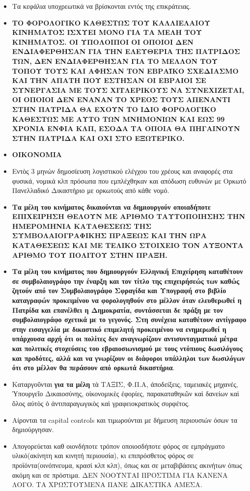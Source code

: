 \documentclass[a4paper]{article}
\begin{document}
\begin{itemize}
\item  Τα κεφάλια υποχρεωτικά να βρίσκονται εντός της επικράτειας.
\item  \textbf{ΤΟ ΦΟΡΟΛΟΓΙΚΟ ΚΑΘΕΣΤΩΣ ΤΟΥ ΚΑΛΛΙΕΛΑΙΟΥ ΚΙΝΗΜΑΤΟΣ ΙΣΧΥΕΙ ΜΟΝΟ ΓΙΑ ΤΑ ΜΕΛΗ ΤΟΥ ΚΙΝΗΜΑΤΟΣ. ΟΙ ΥΠΟΛΟΙΠΟΙ ΟΙ ΟΠΟΙΟΙ ΔΕΝ ΕΝΔΙΑΦΕΡΘΗΣΑΝ ΓΙΑ ΤΗΝ ΕΛΕΥΘΕΡΙΑ ΤΗΣ ΠΑΤΡΙΔΟΣ ΤΩΝ, ΔΕΝ ΕΝΔΙΑΦΕΡΘΗΣΑΝ ΓΙΑ ΤΟ ΜΕΛΛΟΝ ΤΟΥ ΤΟΠΟΥ ΤΟΥΣ ΚΑΙ ΑΦΗΣΑΝ ΤΟΝ ΕΒΡΑΪΚΟ ΣΧΕΔΙΑΣΜΟ ΚΑΙ ΤΗΝ ΑΠΑΤΗ ΠΟΥ ΕΣΤΗΣΑΝ ΟΙ ΕΒΡΑΙΟΙ ΣΕ ΣΥΝΕΡΓΑΣΙΑ ΜΕ ΤΟΥΣ ΧΙΤΛΕΡΙΚΟΥΣ ΝΑ ΣΥΝΕΧΙΖΕΤΑΙ, ΟΙ ΟΠΟΙΟΙ ΔΕΝ ΕΝΑΝΑΝ ΤΟ ΧΡΕΟΣ ΤΟΥΣ ΑΠΕΝΑΝΤΙ ΣΤΗΝ ΠΑΤΡΙΔΑ ΘΑ ΕΧΟΥΝ ΤΟ ΙΔΙΟ ΦΟΡΟΛΟΓΙΚΟ ΚΑΘΕΣΤΩΣ ΜΕ ΑΥΤΟ ΤΩΝ ΜΝΗΜΟΝΙΩΝ ΚΑΙ ΕΩΣ 99 ΧΡΟΝΙΑ ΕΝΦΙΑ ΚΛΠ, ΕΣΟΔΑ ΤΑ ΟΠΟΙΑ ΘΑ ΠΗΓΑΙΝΟΥΝ ΣΤΗΝ ΠΑΤΡΙΔΑ ΚΑΙ ΟΧΙ ΣΤΟ ΕΞΩΤΕΡΙΚΟ.}

\item  \textbf{ΟΙΚΟΝΟΜΙΑ}

\item Εντὸς 3 μηνών δημοσίευση λογιστικού ελέγχου του χρέους και αναφορές στα φυσικά, νομικά κλπ πρόσωπα που εμπλέχθηκαν και απόδωση ευθυνών με Ορκωτό Πανελλαδικό Δικαστήριο με ορκωτούς από κάθε νομό.
\item \textbf{Τα μέλη του κινήματος δικαιούνται να δημιουργούν οποιαδήποτε ΕΠΙΧΕΙΡΗΣΗ ΘΕΛΟΥΝ ΜΕ ΑΡΙΘΜΟ ΤΑΥΤΟΠΟΙΗΣΗΣ ΤΗΝ ΗΜΕΡΟΜΗΝΙΑ ΚΑΤΑΘΕΣΕΩΣ ΤΗΣ ΣΥΜΒΟΛΑΙΟΓΡΑΦΙΚΗΣ ΠΡΑΞΕΩΣ ΚΑΙ ΤΗΝ ΩΡΑ ΚΑΤΑΘΕΣΕΩΣ ΚΑΙ ΜΕ ΤΕΛΙΚΟ ΣΤΟΙΧΕΙΟ ΤΟΝ ΑΥΞΟΝΤΑ ΑΡΙΘΜΟ ΤΟΥ ΠΟΛΙΤΟΥ ΣΤΗΝ ΠΡΑΞΗ.} 
\item \textbf{Τα μέλη του κινήματος που δημιουργούν Ελληνική Επιχείρηση καταθέτουν σε συμβολαιογράφο την έναρξη και τον τίτλο της επιχειρήσεώς των καθώς ζητούν από τον Συμβολαιογράφο Σφραγίδα και Υπογραφή στο βιβλίο καταγραφών προκειμένου να φορολογηθούν στο μέλλον όταν ελευθερωθεί η Πατρίδα και επανέλθει η Δημοκρατία, συντάσσεται δε πράξη με τον συμβολαιογράφο σχετικά με το γεγονός. Στη συνέχεια καταθέτουν αντίγραφο στην εισαγγελία με δικαστικό επιμελητή προκειμένου να ενημερωθεί η υπάρχουσα αρχή ότι οι πολίτες δεν αναγνωρίζουν αντισυνταγματικά μέτρα και πολιτικές στοχεύσεις του εβραιοσιωνισμού με τους ντόπιους δωσιλόγους και προδότες, αλλά και να γνωρίζουν οι διάφοροι υπάλληλοι των δωσιλόγων ότι στο μέλλον θα περάσουν από ορκωτά δικαστήρια}.
\item Καταργοῦνται \textbf{για τα μέλη} τὰ ΤΑΞΙΣ, Φ.Π.Α, ἀποδείξεις, ταμειακὲς μηχανές, Ὑπουργεῖο Δικαιοσύνης, οἰκονομικὲς ἐφορίες, παρακαταθηκῶν καὶ δανείων καὶ ὅλος αὐτὸς ὁ ἀντιπαραγωγικὸς καὶ γραφειοκρατικὸς συρφέτος.
\item Αίρονται τα capital controls και τιμωρούνται με δήμευση περιουσιών όσων τα δημιούργησαν.
\item Απογορεύεται καθ οιονδήποτε τρόπον οποιοσδήποτε φόρος σε εμπράγματο υλικό(ακίνητη και κινητή περιουσία), κι επιπρόσθετος φόρος σε προϊόντα(οινόπνευμα, κρασί κλπ κλπ), όπως και σε μεταβιβάσεις ακινήτων όπως ακόμη και σε πρόστιμα. ΔΕΝ ΝΟΟΥΝΤΑΙ ΠΡΟΣΤΙΜΑ ΓΙΑ ΚΑΝΕΝΑ ΛΟΓΟ. ΤΑ ΧΡΩΣΤΟΥΜΕΝΑ ΠΑΝΕ ΔΙΚΑΣΤΙΚΑ ΑΜΕΣΑ.

\end{itemize}
\end{document}

